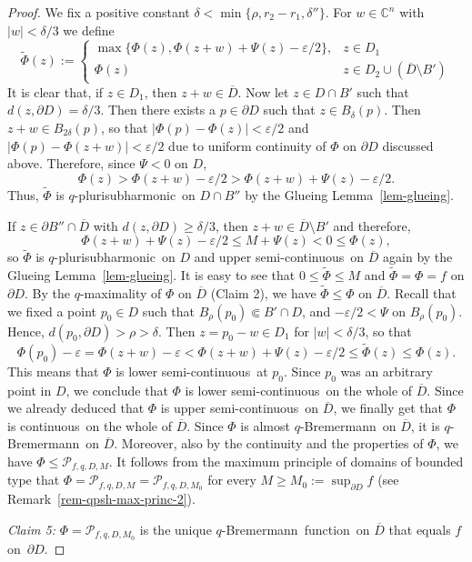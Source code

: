 \documentclass[10pt,a4paper]{amsart}
\numberwithin{equation}{section}
\newcommand{\cbb}{\mathbb{C}}
\newcommand{\pcal}{\mathcal{P}}
\newcommand{\qbrem}{$q$-Bremermann}
\newcommand{\qpsh}{$q$-pluri\-sub\-harmonic}
\newcommand{\cl}[1]{\overline{#1}}
\newcommand{\cont}{continuous}
\newcommand{\usc}{upper semi-continuous}
\newcommand{\lsc}{lower semi-continuous}
\newcommand{\fct}{function}
\newcommand{\cld}{\overline{D}}
\newcommand{\relc}{\Subset}
\newcommand{\eps}{\varepsilon}
\begin{document}
\begin{proof}
We fix a positive constant $\delta< \min\{\rho,r_2-r_1,\delta''\}$. For $w \in \cbb^n$ with $|w|<\delta/3$ we define
\[
\widetilde{\Phi}(z):= \begin{cases} \max\{\Phi(z), \Phi(z+w)+\Psi(z)-\eps/2\},  & z \in D_1  \\ \Phi(z) & z \in D_2 \cup (\cld \setminus B')  \end{cases}
\]
It is clear that, if $z \in D_1$, then $z+w \in \cld$. Now let $z \in D \cap B'$ such that $d(z,\partial D)=\delta/3$. Then there exists a $p \in \partial D$ such that $z \in B_\delta(p)$. Then $z+w \in B_{2\delta}(p)$, so that $|\Phi(p)-\Phi(z)|<\eps/2$ and $|\Phi(p)-\Phi(z+w)|<\eps/2$ due to uniform continuity of $\Phi$ on $\partial D$ discussed above. Therefore, since $\Psi<0$ on $D$,
\[
\Phi(z)> \Phi(z+w) - \eps/2 > \Phi(z+w) + \Psi(z) - \eps/2.
\]
Thus, $\widetilde{\Phi}$ is \qpsh\ on $D \cap B''$ by the Glueing Lemma~\ref{lem-glueing}.

If $z \in \partial B'' \cap \cld$ with $d(z,\partial D)\geq\delta/3$, then $z+w \in \cld \setminus B'$ and therefore, 
\[
\Phi(z+w)+\Psi(z)-\eps/2 \leq M + \Psi(z) < 0 \leq \Phi(z),
\]
so $\widetilde{\Phi}$ is \qpsh\ on $D$ and \usc\ on $\cld$ again by the Glueing Lemma~\ref{lem-glueing}. It is easy to see that $0 \leq \widetilde{\Phi} \leq M$ and $\widetilde{\Phi}=\Phi=f$ on $\partial D$. By the $q$-maximality of $\Phi$ on $\cld$ (Claim 2), we have $\widetilde{\Phi} \leq \Phi$ on $\cld$. Recall that we fixed a point $p_0 \in D$ such that $B_{\rho}(p_0) \relc B' \cap D$,   and $-\eps/2 < \Psi$ on $B_{\rho}(p_0)$. Hence, $d(p_0,\partial D) > \rho>\delta$. Then $z=p_0-w \in D_1$ for $|w| < \delta/3$, so that
\[
\Phi(p_0) -\eps =\Phi(z+w) -\eps < \Phi(z+w) + \Psi(z) -\eps/2 \leq \widetilde{\Phi}(z) \leq \Phi(z).  
\]
This means that $\Phi$ is \lsc\ at $p_0$. Since $p_0$ was an arbitrary point in $D$, we conclude that $\Phi$ is \lsc\ on the whole of $\cl{D}$. Since we already deduced that $\Phi$ is \usc\ on $\cld$, we finally get that $\Phi$ is \cont\ on the whole of $\cld$. Since $\Phi$ is almost \qbrem\ on $\cld$, it is \qbrem\ on $\cld$. Moreover, also by the continuity and the properties of $\Phi$, we have $\Phi \leq \pcal_{f,q,D,M}$. It follows from the maximum principle of domains of bounded type that $\Phi=\pcal_{f,q,D,M}=\pcal_{f,q,D,M_0}$ for every $M \geq M_0:=\sup_{\partial D} f$ (see Remark~\ref{rem-qpsh-max-princ-2}).


\medskip

\textit{Claim 5:} $\Phi=\pcal_{f,q,D,M_0}$ is the unique \qbrem\ \fct\ on $\cld$ that equals $f$ on~$\partial D$.%


\end{proof}
\end{document}
